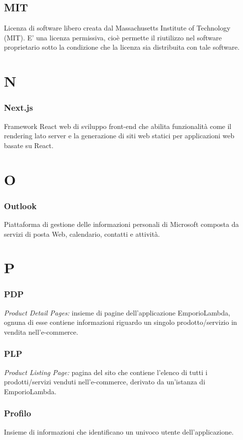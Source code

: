 \subsection*{MIT}
Licenza di software libero creata dal Massachusetts Institute of Technology (MIT).
E' una licenza permissiva, cioè permette il riutilizzo nel software proprietario sotto la condizione che la licenza sia distribuita con tale software.

\section*{N}

\subsubsection*{Next.js}
Framework React web di sviluppo front-end che abilita funzionalità come il rendering lato server e la generazione di siti web statici per applicazioni web basate su React.

\section*{O}
\subsubsection*{Outlook}
Piattaforma di gestione delle informazioni personali di Microsoft composta da servizi di posta Web, calendario, contatti e attività.

\section*{P}
\subsubsection*{PDP}
\textit{Product Detail Pages:} insieme di pagine dell'applicazione EmporioLambda, ognuna di esse contiene informazioni
riguardo un singolo prodotto/servizio in vendita nell'e-commerce.

\subsubsection*{PLP}
\textit{Product Listing Page:} pagina del sito che contiene l'elenco di tutti i prodotti/servizi venduti
nell'e-commerce, derivato da un'istanza di EmporioLambda.

\subsubsection*{Profilo}
Insieme di informazioni che identificano un univoco utente dell'applicazione.

